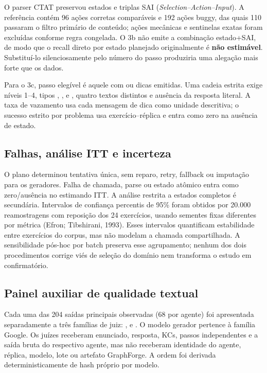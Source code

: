\documentclass[11pt,a4paper]{article}
\newcommand{\ITT}{ITT}
\begin{document}
O parser CTAT preservou estados e triplas SAI (\emph{Selection--Action--Input}). A referência contém 96 ações corretas comparáveis e 192 ações buggy, das quais 110 passaram o filtro primário de conteúdo; ações mecânicas e sentinelas exatas foram excluídas conforme regra congelada. O 3b não emite a combinação estado+SAI, de modo que o recall direto por estado planejado originalmente é \textbf{não estimável}. Substituí-lo silenciosamente pelo número do passo produziria uma alegação mais forte que os dados.

Para o 3c, passo elegível é aquele com  ou dicas emitidas. Uma cadeia estrita exige níveis 1--4, tipos , ,  e , quatro textos distintos e ausência da resposta literal. A taxa de vazamento usa cada mensagem de dica como unidade descritiva; o sucesso estrito por problema usa exercício--réplica e entra como zero na ausência de estado.

\subsection{Falhas, análise \ITT{} e incerteza}

O plano determinou tentativa única, sem reparo, retry, fallback ou imputação para os geradores. Falha de chamada, parse ou estado atômico entra como zero/ausência no estimando \ITT. A análise restrita a estados completos é secundária. Intervalos de confiança percentis de 95\% foram obtidos por 20.000 reamostragens com reposição dos 24 exercícios, usando sementes fixas diferentes por métrica (Efron; Tibshirani, 1993). Esses intervalos quantificam estabilidade entre exercícios do corpus, mas não modelam a chamada compartilhada. A sensibilidade pós-hoc por batch preserva esse agrupamento; nenhum dos dois procedimentos corrige viés de seleção do domínio nem transforma o estudo em confirmatório.

\subsection{Painel auxiliar de qualidade textual}

Cada uma das 204 saídas principais observadas (68 por agente) foi apresentada separadamente a três famílias de juiz: ,  e . O modelo gerador pertence à família Google. Os juízes receberam enunciado, resposta, KCs, passos independentes e a saída bruta do respectivo agente, mas não receberam identidade do agente, réplica, modelo, lote ou artefato GraphForge. A ordem foi derivada deterministicamente de hash próprio por modelo.
\end{document}
